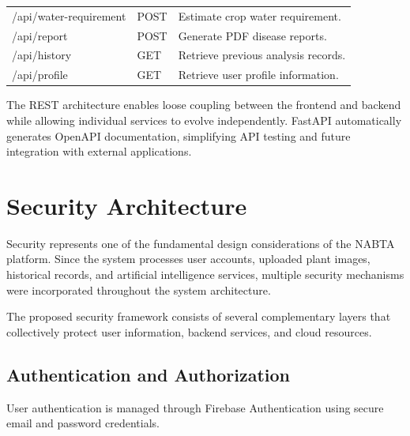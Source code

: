 \begin{table}[H]
\begin{tabularx}{\textwidth}{>{\raggedright\arraybackslash}p{4cm}>{\raggedright\arraybackslash}p{3cm}X}
\\

/api/water-requirement &
POST &
Estimate crop water requirement.

\\

/api/report &
POST &
Generate PDF disease reports.

\\

/api/history &
GET &
Retrieve previous analysis records.

\\

/api/profile &
GET &
Retrieve user profile information.

\\

\bottomrule

\end{tabularx}

\end{table}

The REST architecture enables loose coupling between the frontend and backend while allowing individual services to evolve independently. FastAPI automatically generates OpenAPI documentation, simplifying API testing and future integration with external applications.

\section{Security Architecture}
\label{sec:security}

Security represents one of the fundamental design considerations of the NABTA platform. Since the system processes user accounts, uploaded plant images, historical records, and artificial intelligence services, multiple security mechanisms were incorporated throughout the system architecture.

The proposed security framework consists of several complementary layers that collectively protect user information, backend services, and cloud resources.

\subsection{Authentication and Authorization}

User authentication is managed through Firebase Authentication using secure email and password credentials.

